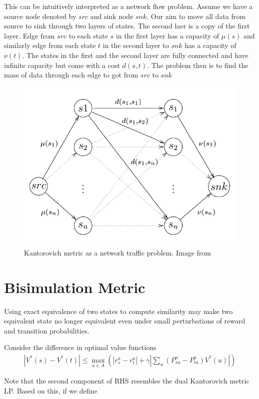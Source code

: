 \documentclass{article}[11pt]
\begin{document}
This can be intuitively interpreted as a network flow problem. Assume we have a source node denoted by $src$ and sink node $snk$. Our aim to move all data from source to sink through two layers of states. The second laer is a copy of the first layer. Edge from $src$ to each state $s$ in the first layer has a capacity of $\mu(s)$ and similarly edge from each state $t$ in the second layer to $snk$ has a capacity of $\nu(t)$. The states in the first and the second layer are fully connected and have infinite capacity but come with a cost $d(s,t)$. The problem then is to find the mass of data through each edge to got from $src$ to $snk$

\begin{figure}[H]
  \begin{center}
    \includegraphics[width=0.7\linewidth]{images/network.png}
    \caption{Kantorovich metric as a network traffic problem. Image from \cite{castro2011planning}}
    \label{fig:cem}
  \end{center}
\end{figure}

\section{Bisimulation Metric}
Using exact equivalence of two states to compute similarity may make two equivalent state no longer equivalent even under small perturbations of reward and transition probabilities. 

Consider the difference in optimal value functions \cite{ferns2004metrics}
\begin{align*}
|V^*(s) - V^*(t)| \le \max_{a \in A} (|r^a_s-r^a_{t}| + \gamma |\sum_u(P^a_{su} - P^a_{tu})V^*(u)|)
\end{align*}

Note that the second component of RHS resembles the dual Kantorovich metric LP. Based on this, if we define 
\end{document}
